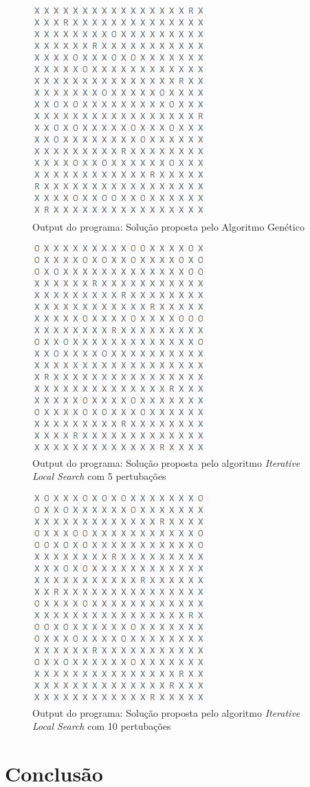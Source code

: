 \documentclass[
	article,			%
	11pt,				%
	oneside,			%
	a4paper,			%
	english,			%
	brazil,				%
	sumario=tradicional
	]{abntex2}
\begin{document}
\begin{figure}
  \centering
  \includegraphics[width=0.30\linewidth]{gen10_18.png}
  \caption{Output do programa: Solução proposta pelo Algoritmo Genético}
  \label{gen}
\end{figure}

\begin{figure}
  \centering
  \includegraphics[width=0.30\linewidth]{ils5_18.png}
  \caption{Output do programa: Solução proposta pelo algoritmo \textit{Iterative Local Search} com 5 pertubações}
  \label{ils5}
\end{figure}

\begin{figure}
  \centering
  \includegraphics[width=0.30\linewidth]{ils10_18.png}
  \caption{Output do programa: Solução proposta pelo algoritmo \textit{Iterative Local Search} com 10 pertubações}
  \label{ils10}
\end{figure}


\section{Conclusão}
\end{document}
